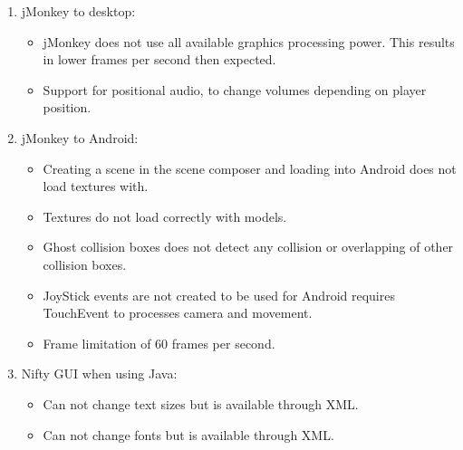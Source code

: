 \documentclass[letterpaper]{article}
\begin{document}
			\begin{enumerate}
				\item jMonkey to desktop:
					\begin{itemize}
						\item jMonkey does not use all available graphics processing power. This results in lower frames per second then expected.
						\item Support for positional audio, to change volumes depending on player position. \\
					\end{itemize}
				
				\item jMonkey to Android:
					\begin{itemize}
						\item Creating a scene in the scene composer and loading into Android does not load textures with.
						\item Textures do not load correctly with models.
						\item Ghost collision boxes does not detect any collision or overlapping of other collision boxes.
						\item JoyStick events are not created to be used for Android requires TouchEvent to processes camera and movement.
						\item Frame limitation of 60 frames per second. \\
					\end{itemize}
				
				\item Nifty GUI when using Java:
					\begin{itemize}
						\item Can not change text sizes but is available through XML.
						\item Can not change fonts but is available through XML.
					\end{itemize}
			\end{enumerate}
				
		\vspace{0.2in}
		\section*{\colorbox{blue}{}}
		\vspace{0.1in}
			
\end{document}
